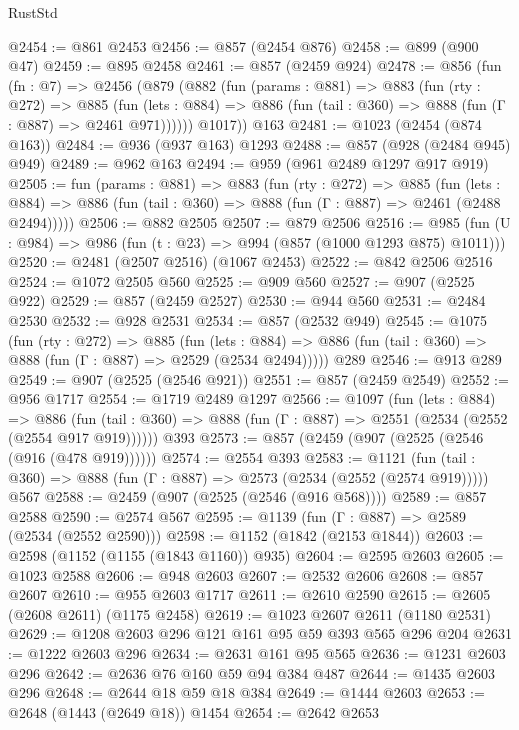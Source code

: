 \begin{lexlean}{RustStd}
\begin{coremodule}
{\begin{coremodule}
{{{{{{{{{@2454 := @861 @2453
@2456 := @857 (@2454 @876)
@2458 := @899 (@900 @47)
@2459 := @895 @2458
@2461 := @857 (@2459 @924)
@2478 := @856
    (fun (fn : @7) =>
    @2456
      (@879
        (@882
          (fun (params : @881) =>
          @883
            (fun (rty : @272) =>
            @885
              (fun (lets : @884) =>
              @886 (fun (tail : @360) => @888 (fun (Γ : @887) => @2461 @971))))))
        @1017))
    @163
@2481 := @1023 (@2454 (@874 @163))
@2484 := @936 (@937 @163) @1293
@2488 := @857 (@928 (@2484 @945) @949)
@2489 := @962 @163
@2494 := @959 (@961 @2489 @1297 @917 @919)
@2505 := fun (params : @881) =>
  @883
    (fun (rty : @272) =>
    @885
      (fun (lets : @884) =>
      @886 (fun (tail : @360) => @888 (fun (Γ : @887) => @2461 (@2488 @2494)))))
@2506 := @882 @2505
@2507 := @879 @2506
@2516 := @985 (fun (U : @984) => @986 (fun (t : @23) => @994 (@857 (@1000 @1293 @875) @1011)))
@2520 := @2481 (@2507 @2516) (@1067 @2453)
@2522 := @842 @2506 @2516
@2524 := @1072 @2505 @560
@2525 := @909 @560
@2527 := @907 (@2525 @922)
@2529 := @857 (@2459 @2527)
@2530 := @944 @560
@2531 := @2484 @2530
@2532 := @928 @2531
@2534 := @857 (@2532 @949)
@2545 := @1075
    (fun (rty : @272) =>
    @885
      (fun (lets : @884) =>
      @886 (fun (tail : @360) => @888 (fun (Γ : @887) => @2529 (@2534 @2494)))))
    @289
@2546 := @913 @289
@2549 := @907 (@2525 (@2546 @921))
@2551 := @857 (@2459 @2549)
@2552 := @956 @1717
@2554 := @1719 @2489 @1297
@2566 := @1097
    (fun (lets : @884) =>
    @886 (fun (tail : @360) => @888 (fun (Γ : @887) => @2551 (@2534 (@2552 (@2554 @917 @919))))))
    @393
@2573 := @857 (@2459 (@907 (@2525 (@2546 (@916 (@478 @919))))))
@2574 := @2554 @393
@2583 := @1121
    (fun (tail : @360) => @888 (fun (Γ : @887) => @2573 (@2534 (@2552 (@2574 @919)))))
    @567
@2588 := @2459 (@907 (@2525 (@2546 (@916 @568))))
@2589 := @857 @2588
@2590 := @2574 @567
@2595 := @1139 (fun (Γ : @887) => @2589 (@2534 (@2552 @2590)))
@2598 := @1152 (@1842 (@2153 @1844))
@2603 := @2598 (@1152 (@1155 (@1843 @1160)) @935)
@2604 := @2595 @2603
@2605 := @1023 @2588
@2606 := @948 @2603
@2607 := @2532 @2606
@2608 := @857 @2607
@2610 := @955 @2603 @1717
@2611 := @2610 @2590
@2615 := @2605 (@2608 @2611) (@1175 @2458)
@2619 := @1023 @2607 @2611 (@1180 @2531)
@2629 := @1208 @2603 @296 @121 @161 @95 @59 @393 @565 @296 @204
@2631 := @1222 @2603 @296
@2634 := @2631 @161 @95 @565
@2636 := @1231 @2603 @296
@2642 := @2636 @76 @160 @59 @94 @384 @487
@2644 := @1435 @2603 @296
@2648 := @2644 @18 @59 @18 @384
@2649 := @1444 @2603
@2653 := @2648 (@1443 (@2649 @18)) @1454
@2654 := @2642 @2653
}}}}}}}}}
\end{coremodule}}
\end{coremodule}
\end{lexlean}
